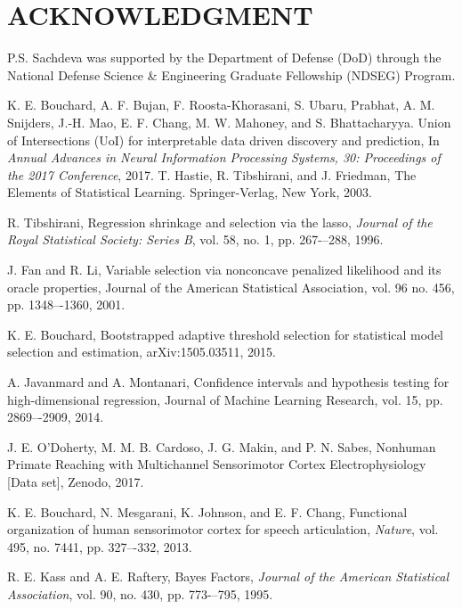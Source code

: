 \documentclass[letterpaper, 10 pt, conference]{ieeeconf}  %
\begin{document}




\section*{ACKNOWLEDGMENT}

P.S. Sachdeva was supported by the Department of Defense (DoD) through the National Defense Science \& Engineering Graduate Fellowship (NDSEG) Program.






\begin{thebibliography}{99}

 K. E. Bouchard, A. F. Bujan, F. Roosta-Khorasani, S. Ubaru, Prabhat, A. M. Snijders, J.-H. Mao, E. F. Chang, M. W. Mahoney, and S. Bhattacharyya. Union of Intersections (UoI) for interpretable data driven discovery and prediction, In \textit{Annual Advances in Neural Information Processing Systems, 30: Proceedings of the 2017 Conference}, 2017.
 T. Hastie, R. Tibshirani, and J. Friedman, The Elements of Statistical Learning. Springer-Verlag, New York, 2003.

 R. Tibshirani, Regression shrinkage and selection via the lasso, \textit{Journal of the Royal Statistical Society: Series B}, vol. 58, no. 1, pp. 267-–288, 1996.

 J. Fan and R. Li, Variable selection via nonconcave penalized likelihood and its oracle properties, Journal of the American Statistical Association, vol. 96 no. 456, pp. 1348–-1360, 2001.

 K. E. Bouchard, Bootstrapped adaptive threshold selection for statistical model selection and estimation, arXiv:1505.03511, 2015.

 A. Javanmard and A. Montanari, Confidence intervals and hypothesis testing for high-dimensional regression, Journal of Machine Learning Research, vol. 15, pp. 2869–-2909, 2014.

 J. E. O'Doherty, M. M. B. Cardoso, J. G. Makin, and P. N. Sabes, Nonhuman Primate Reaching with Multichannel Sensorimotor Cortex Electrophysiology [Data set], Zenodo, 2017.

 K. E. Bouchard, N. Mesgarani, K. Johnson, and E. F. Chang, Functional organization of human sensorimotor cortex for speech articulation, \textit{Nature}, vol. 495, no. 7441, pp. 327–-332, 2013.

 R. E. Kass and A. E. Raftery, Bayes Factors, \textit{Journal of the American Statistical Association}, vol. 90, no. 430, pp. 773-–795, 1995.






\end{thebibliography}
\end{document}
